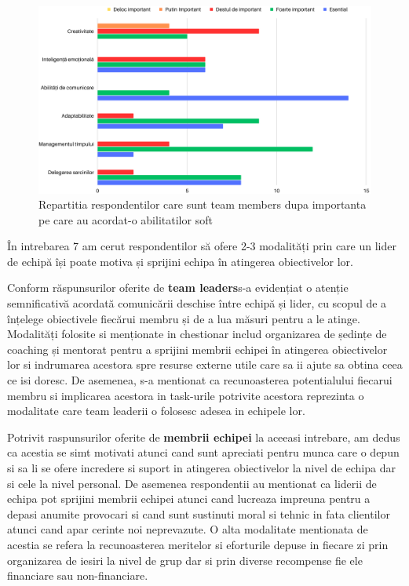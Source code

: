 \documentclass[a4paper, 12pt]{article}
\begin{document}
\begin{enumerate}[A)]
	\quad \begin{figure}[!htb]
			\centering
			\includegraphics[width=17cm, height=12 cm]{"figures/team members (2).png"}
			\caption {Repartitia respondentilor care sunt team members dupa importanta pe care au acordat-o abilitatilor soft}\label{fig:four}
			
		\end{figure}


\newpage 
	\quad În intrebarea 7 am cerut respondentilor să ofere 2-3 modalități prin care un lider de echipă își poate motiva și sprijini echipa în atingerea obiectivelor lor.  

	\quad Conform răspunsurilor oferite de \textbf {team leaders}s-a evidențiat o atenție semnificativă acordată comunicării deschise între echipă și lider, cu scopul de a înțelege obiectivele fiecărui membru și de a lua măsuri pentru a le atinge. Modalități folosite si menționate in chestionar includ organizarea de ședințe de coaching și mentorat pentru a sprijini membrii echipei în atingerea obiectivelor lor si indrumarea acestora spre resurse externe utile care sa ii ajute sa obtina ceea ce isi doresc. De asemenea, s-a mentionat ca recunoasterea potentialului fiecarui membru si implicarea acestora in task-urile potrivite acestora reprezinta o modalitate care team leaderii o folosesc adesea in echipele lor.

	\quad Potrivit raspunsurilor oferite de\textbf{ membrii echipei} la aceeasi intrebare, am dedus ca acestia se simt motivati atunci cand sunt apreciati pentru munca care o depun si sa li se ofere incredere si suport in atingerea obiectivelor la nivel de echipa dar si cele la nivel personal. De asemenea respondentii au mentionat ca liderii de echipa pot sprijini membrii echipei atunci cand lucreaza impreuna pentru a depasi anumite provocari si cand sunt sustinuti moral si tehnic in fata clientilor atunci cand apar cerinte noi neprevazute. O alta modalitate mentionata de acestia se refera la recunoasterea meritelor si eforturile depuse in fiecare zi prin organizarea de iesiri la nivel de grup dar si prin diverse recompense fie ele financiare sau non-financiare.


\end{enumerate}
\end{document}
